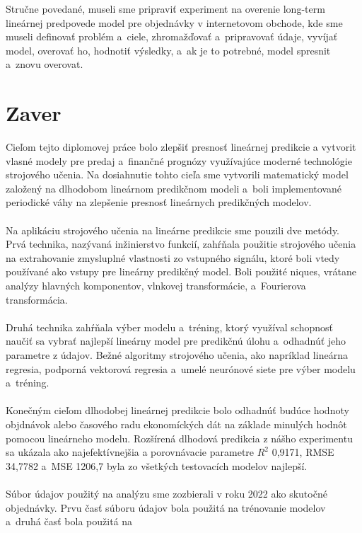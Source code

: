     Stručne povedané, museli sme pripraviť experiment na overenie long-term lineárnej predpovede model pre objednávky v
    internetovom obchode, kde sme museli definovať problém a~ciele, zhromažďovať a~pripravovať údaje, vyvíjať model,
    overovať ho, hodnotiť výsledky, a~ak je to potrebné, model spresnit a~znovu overovat.

    \section{Zaver}
    Cieľom tejto diplomovej práce bolo zlepšiť presnosť lineárnej predikcie
    a vytvorit vlasné modely pre predaj a~finančné prognózy využívajúce moderné technológie
    strojového učenia. Na dosiahnutie tohto cieľa sme vytvorili matematický model založený na dlhodobom lineárnom
    predikčnom modeli a~boli implementované periodické váhy na zlepšenie presnosť lineárnych predikčných modelov.\\
    \\
    Na aplikáciu strojového učenia na lineárne predikcie sme pouzili dve metódy. Prvá technika,
    nazývaná inžinierstvo funkcií, zahŕňala použitie strojového učenia na extrahovanie zmysluplné
    vlastnosti zo vstupného signálu, ktoré boli vtedy používané ako vstupy pre lineárny predikčný
    model. Boli použité niques, vrátane analýzy hlavných komponentov, vlnkovej transformácie,
    a~Fourierova transformácia.\\
    \\
    Druhá technika zahŕňala výber modelu a~tréning, ktorý využíval schopnosť
    naučiť sa vybrať najlepší lineárny model pre predikčnú úlohu a~odhadnúť jeho
    parametre z údajov. Bežné algoritmy strojového učenia, ako napríklad lineárna regresia,
    podporná vektorová regresia a~umelé neurónové siete pre výber modelu a~tréning.\\
    \\
    Konečným cieľom dlhodobej lineárnej predikcie bolo odhadnúť budúce hodnoty
    objdnávok alebo časového radu ekonomíckých dát na základe minulých hodnôt pomocou
    lineárneho modelu. Rozšírená dlhodová predikcia z nášho experimentu sa ukázala ako
    najefektívnejšia a porovnávacie parametre $R^2$ 0,9171, RMSE 34,7782 a~MSE 1206,7 byla zo všetkých
    testovacích modelov najlepší.\\
    \\
    Súbor údajov použitý na analýzu sme zozbierali v roku 2022 ako skutočné objednávky. Prvu
    časť súboru údajov bola použitá na trénovanie modelov a~druhá časť bola použitá na
